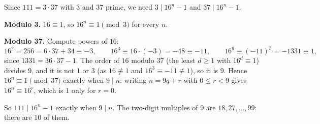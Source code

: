 Since $111=3\cdot37$ with $3$ and $37$ prime, we need $3\mid16^n-1$ and $37\mid16^n-1$.

\textbf{Modulo 3.} $16\equiv1$, so $16^n\equiv1\pmod3$ for every $n$.

\textbf{Modulo 37.} Compute powers of $16$:
\[16^2=256=6\cdot37+34\equiv-3,\qquad16^3\equiv16\cdot(-3)=-48\equiv-11,\qquad16^9\equiv(-11)^3=-1331\equiv1,\]
since $1331=36\cdot37-1$. The order of $16$ modulo $37$ (the least $d\ge1$ with $16^d\equiv1$) divides $9$, and it is not $1$ or $3$ (as $16\not\equiv1$ and $16^3\equiv-11\not\equiv1$), so it is $9$. Hence $16^n\equiv1\pmod{37}$ exactly when $9\mid n$: writing $n=9q+r$ with $0\le r<9$ gives $16^n\equiv16^r$, which is $1$ only for $r=0$.

So $111\mid16^n-1$ exactly when $9\mid n$. The two-digit multiples of $9$ are $18,27,\dots,99$: there are $\boxed{10}$ of them.
